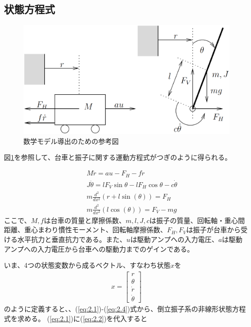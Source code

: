\documentclass[a4j,11pt,twoside]{jbook}
\begin{document}
\subsection{状態方程式}
\begin{figure}[htbp]
	\begin{center}
		\includegraphics[width = 0.6 \linewidth]{modeling.eps}
		\caption{数学モデル導出のための参考図}
		\label{fig:数式モデル導出のための参考図}
	\end{center}
\end{figure}

図\ref{fig:数式モデル導出のための参考図}を参照して、台車と振子に関する運動方程式がつぎのように得られる。

\begin{eqnarray}
&&M \ddot{r} = au - F_H - f \dot{r}
\label{eq:2.1}\\
&&J \ddot{\theta} = lF_V\sin{\theta} - lF_H\cos{\theta} - c\dot{\theta}
\label{eq:2.2}\\
&&m \frac{d^2}{dx^2} (r + l\sin(\theta))  =  F_H
\label{eq:2.3}\\
&&m \frac{d^2}{dx^2} (l\cos(\theta))  =  F_V - mg
\label{eq:2.4}
\end{eqnarray}
ここで、$M,f$は台車の質量と摩擦係数、$m,l,J,c$は振子の質量、回転軸・重心間距離、重心まわり慣性モーメント、回転軸摩擦係数、$F_H,F_V$は振子が台車から受ける水平抗力と垂直抗力である。また、$u$は駆動アンプへの入力電圧、$a$は駆動アンプへの入力電圧から台車への駆動力までのゲインである。

いま、4つの状態変数から成るベクトル、すなわち状態$x$を
\begin{eqnarray}
	x=\left[
	\begin{array}{c}
		r\\
		\theta\\
		\dot{r}\\
		\dot{\theta}
	\end{array}
	\right]
\end{eqnarray}
のように定義すると、、(\ref{eq:2.1})-(\ref{eq:2.4})式から、倒立振子系の非線形状態方程式を求める。
(\ref{eq:2.1})に(\ref{eq:2.2})を代入すると
\end{document}
